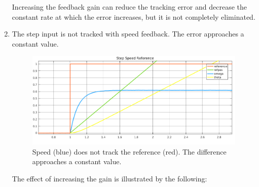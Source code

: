 \documentclass[11pt,a4paper]{article}
\begin{document}
\begin{enumerate}
Increasing the feedback gain can reduce the tracking error and decrease the constant rate at which the error increases, but it is not completely eliminated. 

	\item The step input is not tracked with speed feedback. The error approaches a constant value.
	
	\begin{figure}[!htbp]
	\includegraphics[width=\textwidth]{imglab/lab4sol_stepspeedtraj.png}
	\caption{Speed (blue) does not track the reference (red). The difference approaches a constant value.}
	\end{figure}	
	
		The effect of increasing the gain is illustrated by the following:
	

\end{enumerate}
\end{document}
